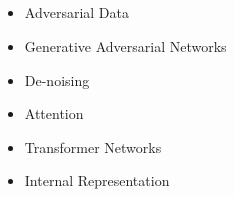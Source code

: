     \subsection*{}

    \begin{itemize}
        \item Adversarial Data
        \item Generative Adversarial Networks
        \item De-noising
        \item Attention
        \item Transformer Networks
        \item Internal Representation
    \end{itemize}

        

        
